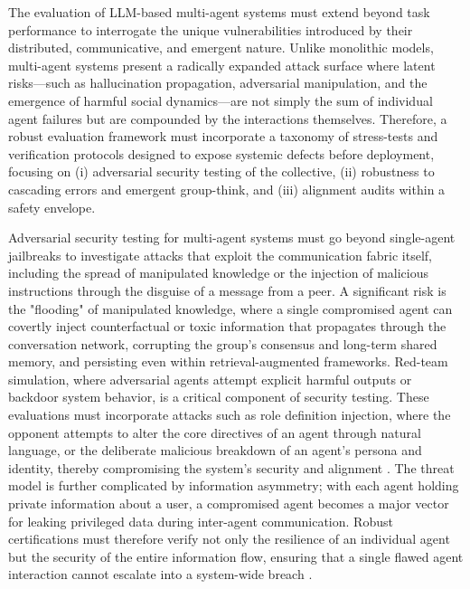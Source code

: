 \documentclass[11pt,a4paper]{article}
\begin{document}
The evaluation of LLM-based multi-agent systems must extend beyond task performance to interrogate the unique vulnerabilities introduced by their distributed, communicative, and emergent nature. Unlike monolithic models, multi-agent systems present a radically expanded attack surface where latent risks---such as hallucination propagation, adversarial manipulation, and the emergence of harmful social dynamics---are not simply the sum of individual agent failures but are compounded by the interactions themselves. Therefore, a robust evaluation framework must incorporate a taxonomy of stress-tests and verification protocols designed to expose systemic defects before deployment, focusing on (i) adversarial security testing of the collective, (ii) robustness to cascading errors and emergent group-think, and (iii) alignment audits within a safety envelope.

Adversarial security testing for multi-agent systems must go beyond single-agent jailbreaks to investigate attacks that exploit the communication fabric itself, including the spread of manipulated knowledge or the injection of malicious instructions through the disguise of a message from a peer. A significant risk is the "flooding" of manipulated knowledge, where a single compromised agent can covertly inject counterfactual or toxic information that propagates through the conversation network, corrupting the group's consensus and long-term shared memory, and persisting even within retrieval-augmented frameworks. Red-team simulation, where adversarial agents attempt explicit harmful outputs or backdoor system behavior, is a critical component of security testing. These evaluations must incorporate attacks such as role definition injection, where the opponent attempts to alter the core directives of an agent through natural language, or the deliberate malicious breakdown of an agent's persona and identity, thereby compromising the system's security and alignment \cite{arxiv:2306.07929v2,arxiv:2407.07791v2}. The threat model is further complicated by information asymmetry; with each agent holding private information about a user, a compromised agent becomes a major vector for leaking privileged data during inter-agent communication. Robust certifications must therefore verify not only the resilience of an individual agent but the security of the entire information flow, ensuring that a single flawed agent interaction cannot escalate into a system-wide breach \cite{arxiv:2406.14928v1}.
\end{document}
